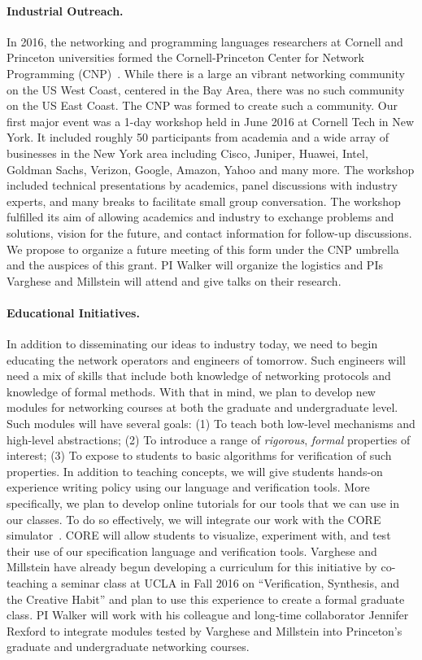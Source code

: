 \paragraph*{Industrial Outreach.}
In 2016, the networking and programming languages
researchers at Cornell and Princeton universities 
formed the Cornell-Princeton Center for Network 
Programming (CNP)~\cite{center-for-network-programming}.
While there is a large an vibrant networking community on the US
West Coast, centered in the Bay Area, there was no such community on
the US East Coast.  The CNP was formed to create such a community.
Our first major event was a 1-day workshop held in June 2016 at
Cornell Tech in New York.  It included roughly 50 participants from
academia and a wide array of businesses in the New York area including
Cisco, Juniper, Huawei, Intel, Goldman Sachs, Verizon, Google, Amazon,
Yahoo and many more.  The workshop included technical presentations by
academics, panel discussions with industry experts, and many breaks to
facilitate small group conversation.  The workshop fulfilled its aim
of allowing academics and industry to exchange problems and solutions,
vision for the future, and contact information for follow-up
discussions. We propose to organize a future meeting of this form
under the CNP umbrella and the auspices of this grant.  PI Walker will
organize the logistics and PIs Varghese and Millstein will attend and
give talks on their research.

\paragraph*{Educational Initiatives.}
In addition to disseminating our ideas to industry today,
we need to begin educating the network operators and engineers 
of tomorrow.  Such engineers will need a mix of skills that include
both knowledge of networking protocols and knowledge of formal methods.
With that in mind, we plan to develop new modules for networking courses
at both the graduate and undergraduate level.  
Such modules will have
several goals: (1) To teach both low-level mechanisms and high-level abstractions;
(2) To introduce a range of \emph{rigorous}, \emph{formal} properties of
 interest; (3) To expose to students to basic algorithms for verification of such
properties.
In addition to teaching concepts, we will give students hands-on
experience writing policy using our language and verification tools.  
More specifically, we plan to develop online tutorials for our tools
that we can use in our classes.  To do so effectively, we will
integrate our work with the CORE simulator~\cite{core}.  CORE
will allow students to visualize, experiment with, and test their
use of our specification language and verification tools.
Varghese and Millstein have already begun developing a curriculum for this initiative
by co-teaching a seminar class at UCLA in Fall 2016 on ``Verification, Synthesis, and the Creative Habit'' 
and plan to use this experience to create a formal graduate class.  PI Walker will work with
his colleague and long-time collaborator Jennifer Rexford to integrate modules tested by Varghese and Millstein into Princeton's
graduate and undergraduate networking courses.

